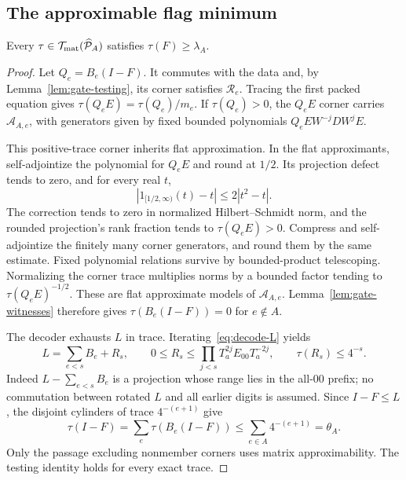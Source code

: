 \subsection{The approximable flag minimum}
\begin{proposition}\label{prop:gate-flag}
Every $\tau\in\mathcal T_{\rm mat}(\widehat{\mathcal P}_A)$ satisfies $\tau(F)\ge\lambda_A$.
\end{proposition}
\begin{proof}
Let $Q_e=B_e(I-F)$. It commutes with the data and, by Lemma~\ref{lem:gate-testing}, its corner satisfies $\mathcal R_e$. Tracing the first packed equation gives $\tau(Q_eE)=\tau(Q_e)/m_e$. If $\tau(Q_e)>0$, the $Q_eE$ corner carries $\mathcal A_{A,e}$, with generators given by fixed bounded polynomials $Q_eEW^{-j}DW^jE$.

This positive-trace corner inherits flat approximation. In the flat approximants, self-adjointize the polynomial for $Q_eE$ and round at $1/2$. Its projection defect tends to zero, and for every real $t$,
\[
 |1_{[1/2,\infty)}(t)-t|\le2|t^2-t|.
\]
The correction tends to zero in normalized Hilbert--Schmidt norm, and the rounded projection's rank fraction tends to $\tau(Q_eE)>0$. Compress and self-adjointize the finitely many corner generators, and round them by the same estimate. Fixed polynomial relations survive by bounded-product telescoping. Normalizing the corner trace multiplies norms by a bounded factor tending to $\tau(Q_eE)^{-1/2}$. These are flat approximate models of $\mathcal A_{A,e}$. Lemma~\ref{lem:gate-witnesses} therefore gives $\tau(B_e(I-F))=0$ for $e\notin A$.

The decoder exhausts $L$ in trace. Iterating~\eqref{eq:decode-L} yields
\[
 L=\sum_{e<s}B_e+R_s,\qquad
 0\le R_s\le\prod_{j<s}T_a^{2j}E_{00}T_a^{-2j},\qquad \tau(R_s)\le4^{-s}.
\]
Indeed $L-\sum_{e<s}B_e$ is a projection whose range lies in the all-00 prefix; no commutation between rotated $L$ and all earlier digits is assumed. Since $I-F\le L$, the disjoint cylinders of trace $4^{-(e+1)}$ give
\[
 \tau(I-F)=\sum_e\tau(B_e(I-F))
 \le\sum_{e\in A}4^{-(e+1)}=\theta_A.
\]
Only the passage excluding nonmember corners uses matrix approximability. The testing identity holds for every exact trace.
\end{proof}

